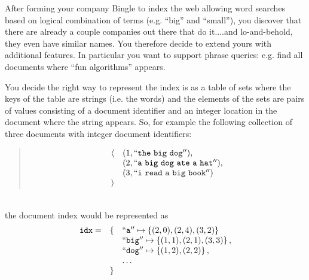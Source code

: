 
After forming your company Bingle to index the web allowing word
searches based on logical combination of terms (e.g. ``big'' and
``small''), you discover that there are already a couple companies out
there that do it....and lo-and-behold, they even have similar names.
You therefore decide to extend yours with additional features.  In
particular you want to support phrase queries: e.g. find all
documents where ``fun algorithms'' appears.

You decide the right way to represent the index is as a table of sets
where the keys of the table are strings (i.e. the words) and the
elements of the sets are pairs of values consisting of a document
identifier and an integer location in the document where the string
appears.  So, for example the following collection of three documents
with integer document identifiers:
%
\begin{quote}
\[
\begin{array}{ll}
\langle 
& (1, \mathtt{``the~big~dog''}), 
\\
& (2, \mathtt{``a~big~dog~ate~a~hat''}),
\\
& (3, \mathtt{``i~read~a~big~book''})
\\
\rangle
\end{array}
\]
\end{quote}
~\\
the document index would be represented as
\[
\begin{array}{lll}
\mathtt{idx} = & \{ & \mathtt{``a''} \mapsto \left\{ (2,0),(2,4),(3,2) \right\}
\\
            &    &  \mathtt{``big''} \mapsto \left\{ (1,1),(2,1),(3,3) \right\},
\\
            &   & \mathtt{``dog''} \mapsto \left\{ (1,2),(2,2) \right\},
\\
            &   & \ldots
\\
            & \} &
\end{array}
\]

